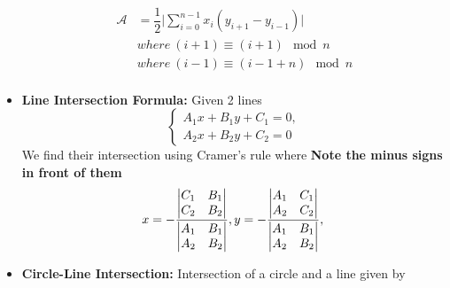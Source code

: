 \documentclass[15pt,a4paper]{article}
\begin{document}
\begin{landscape}
\begin{multicols*}{3}
\begin{itemize}
        \begin{equation*}
        \begin{aligned}
            \mathcal{A} &= \dfrac{1}{2} \bigg|\sum_{i = 0}^{n - 1}x_i(y_{i + 1} - y_{i - 1}) \bigg| \\
                        & where\ (i + 1) \equiv (i + 1) \mod {n}\\
                        & where\ (i - 1) \equiv (i - 1 + n) \mod {n}\\
        \end{aligned}
        \end{equation*}
    \item \textbf{Line Intersection Formula: } Given 2 lines
    \begin{equation*}
        \begin{cases*}
            A_1x + B_1y + C_1 = 0,\\
            A_2x + B_2y + C_2 = 0
        \end{cases*}
    \end{equation*}
    We find their intersection using Cramer's rule where \textbf{Note the minus signs in front of them}
    \begin{equation*}
        x = -\dfrac{\begin{vmatrix}
                C_1 & B_1\\
                C_2 & B_2\\
            \end{vmatrix}}{\begin{vmatrix}
                A_1 & B_1\\
                A_2 & B_2\\
            \end{vmatrix}},
        \\
        y = -\dfrac{\begin{vmatrix}
                A_1 & C_1\\
                A_2 & C_2\\
            \end{vmatrix}}{\begin{vmatrix}
                A_1 & B_1\\
                A_2 & B_2\\
            \end{vmatrix}},\\       
    \end{equation*}
    \item \textbf{Circle-Line Intersection:} Intersection of a circle and a line given by

\end{itemize}
\end{multicols*}
\end{landscape}
\end{document}
